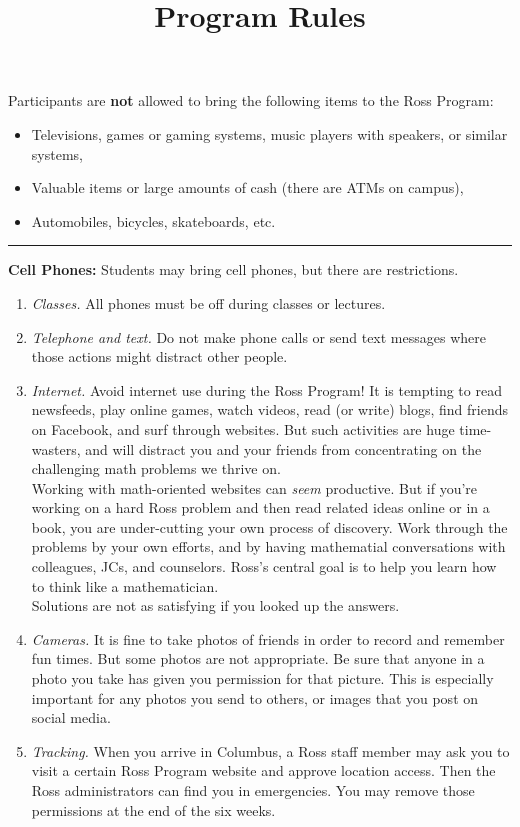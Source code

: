\documentclass{ross}
\title{Program Rules}
\begin{document}
\maketitle
Participants are {\bf not} allowed to bring the following items to the Ross
Program:
\begin{itemize}
\item Televisions, games or gaming systems, music players with speakers, or similar systems,
\item Valuable items or large amounts of cash (there are ATMs on campus),
\item Automobiles, bicycles, skateboards, etc.
\end{itemize}

\bigskip\hrule
\textbf{Cell Phones:} Students may bring cell phones, but there are restrictions. 
\begin{enumerate}[label=(\roman*),itemsep=0.5em,topsep= 0em]

\item {\it Classes.}  All phones must be off during classes or lectures. 

\item {\it Telephone and text.}  Do not make phone calls or send text messages 
where those actions might distract other people.

\item {\it Internet.} Avoid internet use during the Ross Program! 
It is tempting to read newsfeeds, play online games, watch videos, read (or write) blogs, 
find friends on Facebook, and surf through websites.  But such activities are huge time-wasters, 
and will distract you and your friends from concentrating on the challenging math problems we thrive on.  \\[5pt]
Working with math-oriented websites can {\it seem} productive. But if you're working on a 
hard Ross problem and then read related ideas online or in a book, you are under-cutting 
your own process of discovery. Work through the problems by your own efforts, and by having 
mathematial conversations with colleagues, JCs, and counselors.  Ross's central goal is to 
help you learn how to think like a mathematician.\\
\hspace*{1cm} Solutions are not as satisfying if you looked up the answers.

\item {\it Cameras.}  It is fine to take photos of friends in order to record and remember fun times.  
But some photos are not appropriate.  Be sure that anyone in a photo you take has given you permission 
for that picture.  This is especially important for any photos you send to others, or images that you post on social media. 

\item{\it Tracking.}  When you arrive in Columbus, a Ross staff member
may ask you to visit a certain Ross Program website and approve
location access.  Then the Ross administrators can find you in
emergencies. You may remove those permissions at the end of the six
weeks.
\end{enumerate}
\end{document}
